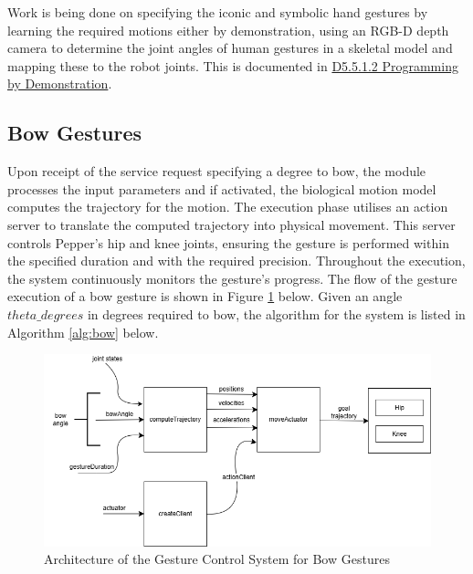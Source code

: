 \documentclass{CSSRforAfrica}
\begin{document}
Work is being done on specifying the iconic and symbolic hand gestures by learning the required motions either by demonstration, using an RGB-D depth camera to determine the joint angles of human gestures in a skeletal model and mapping these to the robot joints.   This is documented in \href{https://cssr4africa.github.io/deliverables/CSSR4Africa_Deliverable_D5.5.1.2.pdf} {D5.5.1.2 Programming by Demonstration}. 




\newpage
\subsection{Bow Gestures}

Upon receipt of the service request specifying a degree to bow, the module processes the input parameters and if activated, the biological motion model computes the trajectory for the motion. The execution phase utilises an action server to translate the computed trajectory into physical movement. This server controls Pepper's hip and knee joints, ensuring the gesture is performed within the specified duration and with the required precision. Throughout the execution, the system continuously monitors the gesture's progress.  The flow of the gesture execution of a bow gesture is shown in Figure \ref{fig:bowarchitecture} below. Given an angle $theta\_degrees$  in degrees required to bow, the algorithm for the system is listed in Algorithm \ref{alg:bow} below.

\begin{figure}[h!]
  \centering \includegraphics[scale=0.4]{Bow Architecture.png}
  \caption{Architecture of the Gesture Control System for Bow Gestures}
\label{fig:bowarchitecture}
\end{figure}
\end{document}
